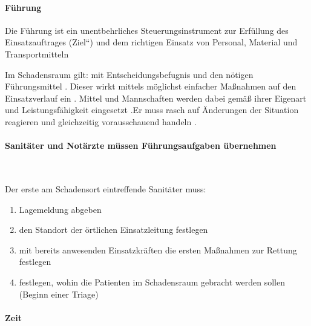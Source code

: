 \paragraph{F\"uhrung}

Die F\"uhrung ist ein unentbehrliches Steuerungsinstrument zur
Erf\"ullung des Einsatzauftrages
({\quotedblbase}Ziel{\textquotedblleft}) und dem richtigen Einsatz von
Personal, Material und Transportmitteln 

Im Schadensraum gilt: {\quotedblbase} mit Entscheidungsbefugnis und den
n\"otigen F\"uhrungsmittel . Dieser wirkt mittels m\"oglichst
einfacher Ma{\ss}nahmen 
auf den Einsatzverlauf ein
. Mittel und
Mannschaften werden dabei gem\"a{\ss} ihrer Eigenart und
Leistungsf\"ahigkeit eingesetzt .Er muss rasch auf \"Anderungen der
Situation reagieren 
und gleichzeitig vorausschauend handeln
.


\paragraph{Sanit\"ater und Not\"arzte m\"ussen F\"uhrungsaufgaben
\"ubernehmen}~

Der erste am Schadensort eintreffende Sanit\"ater muss:

\begin{enumerate}
    \item Lagemeldung abgeben
    \item den Standort der \"ortlichen Einsatzleitung festlegen
    \item mit bereits anwesenden Einsatzkr\"aften die ersten Ma{\ss}nahmen
    zur Rettung festlegen
    \item festlegen, wohin die Patienten im Schadensraum gebracht werden sollen (Beginn einer Triage)
\end{enumerate}

\paragraph{Zeit}

